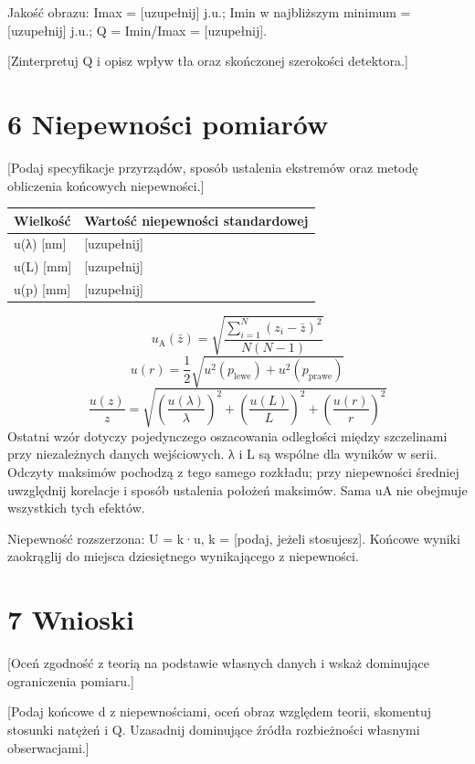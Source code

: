 \documentclass[11pt,a4paper]{article}
\begin{document}
Jakość obrazu: Imax = [uzupełnij] j.u.; Imin w najbliższym minimum = [uzupełnij] j.u.; Q = Imin/Imax = [uzupełnij].

[Zinterpretuj Q i opisz wpływ tła oraz skończonej szerokości detektora.]

\clearpage
\section*{6 Niepewności pomiarów}
[Podaj specyfikacje przyrządów, sposób ustalenia ekstremów oraz metodę obliczenia końcowych niepewności.]

\begingroup\small\begin{tabularx}{\linewidth}{|Y|Y|}\hline
\textbf{Wielkość} & \textbf{Wartość niepewności standardowej} \\ \hline
u(λ) [nm] & [uzupełnij] \\ \hline
u(L) [mm] & [uzupełnij] \\ \hline
u(p) [mm] & [uzupełnij] \\ \hline
\end{tabularx}\endgroup\par\medskip
\[
u_{\mathrm A}(\bar z)=\sqrt{\frac{\sum_{i=1}^{N}(z_i-\bar z)^2}{N(N-1)}}
\]
\[
u(r)=\frac12\sqrt{u^2(p_{\mathrm{lewe}})+u^2(p_{\mathrm{prawe}})}
\]
\[
\frac{u(z)}{z}=\sqrt{\left(\frac{u(\lambda)}{\lambda}\right)^2+\left(\frac{u(L)}{L}\right)^2+\left(\frac{u(r)}{r}\right)^2}
\]
Ostatni wzór dotyczy pojedynczego oszacowania odległości między szczelinami przy niezależnych danych wejściowych. λ i L są wspólne dla wyników w serii. Odczyty maksimów pochodzą z tego samego rozkładu; przy niepewności średniej uwzględnij korelacje i sposób ustalenia położeń maksimów. Sama uA nie obejmuje wszystkich tych efektów.

Niepewność rozszerzona: U = k·u, k = [podaj, jeżeli stosujesz]. Końcowe wyniki zaokrąglij do miejsca dziesiętnego wynikającego z niepewności.

\section*{7 Wnioski}
[Oceń zgodność z teorią na podstawie własnych danych i wskaż dominujące ograniczenia pomiaru.]

[Podaj końcowe d z niepewnościami, oceń obraz względem teorii, skomentuj stosunki natężeń i Q. Uzasadnij dominujące źródła rozbieżności własnymi obserwacjami.]
\end{document}
